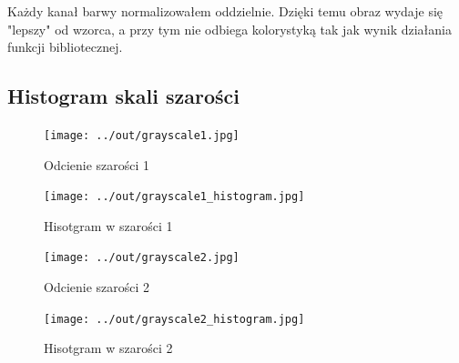 \documentclass[a4paper,12pt]{article}
\begin{document}
Każdy kanał barwy normalizowałem oddzielnie. Dzięki temu obraz wydaje się "lepszy" od wzorca, a przy tym nie odbiega kolorystyką tak jak wynik działania funkcji bibliotecznej.




\newpage
\subsection{Histogram skali szarości}

\begin{figure}[ht!]
\begin{minipage}[t]{7.5cm}
\begin{center}
\texttt{[image: ../out/grayscale1.jpg]}
\caption{Odcienie szarości 1}
\end{center}
\end{minipage}
\hfill
\begin{minipage}[t]{7.5cm}
\begin{center}
\texttt{[image: ../out/grayscale1\_histogram.jpg]}
\caption{Hisotgram w szarości 1}
\end{center}
\end{minipage}
\end{figure} 

\begin{figure}[ht!]
\begin{minipage}[t]{7.5cm}
\begin{center}
\texttt{[image: ../out/grayscale2.jpg]}
\caption{Odcienie szarości 2}
\end{center}
\end{minipage}
\hfill
\begin{minipage}[t]{7.5cm}
\begin{center}
\texttt{[image: ../out/grayscale2\_histogram.jpg]}
\caption{Hisotgram w szarości 2}
\end{center}
\end{minipage}
\end{figure} 


\end{document}
